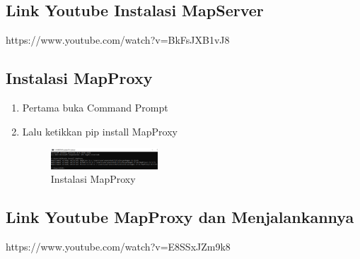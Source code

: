 \subsection{Link Youtube Instalasi MapServer}
{https://www.youtube.com/watch?v=BkFsJXB1vJ8}

\subsection{Instalasi MapProxy}
\begin{enumerate}
  \item Pertama buka Command Prompt
  \item Lalu ketikkan pip install MapProxy
  \hfill\break
  \begin{figure}[H]
  \includegraphics[width=4cm]{figures/tugas4/1174062/14.png}
  \centering
  \caption{Instalasi MapProxy}
  \end{figure}

\end{enumerate}

\subsection{Link Youtube MapProxy dan Menjalankannya}
https://www.youtube.com/watch?v=E8SSxJZm9k8